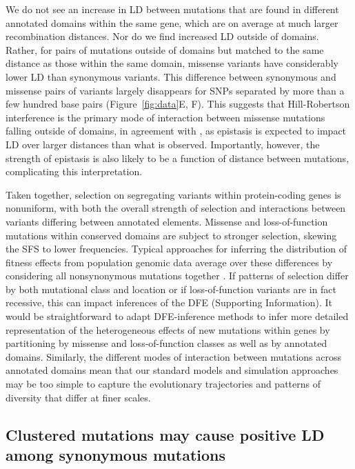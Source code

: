 \documentclass[]{article}
\begin{document}
We do not see an increase in LD between mutations that are found in different
annotated domains within the same gene, which are on average at much larger
recombination distances. Nor do we find increased LD outside of domains.
Rather, for pairs of mutations outside of domains but matched to the same
distance as those within the same domain, missense variants have considerably
lower LD than synonymous variants. This difference between synonymous and
missense pairs of variants largely disappears for SNPs separated by more than a
few hundred base pairs (Figure~\ref{fig:data}E, F). This suggests that
Hill-Robertson interference is the primary mode of interaction between missense
mutations falling outside of domains, in agreement with \citet{Garcia2021-zn},
as epistasis is expected to impact LD over larger distances than what is
observed. Importantly, however, the strength of epistasis is also likely to be
a function of distance between mutations, complicating this interpretation.

Taken together, selection on segregating variants within protein-coding genes
is nonuniform, with both the overall strength of selection and interactions
between variants differing between annotated elements. Missense and
loss-of-function mutations within conserved domains are subject to stronger
selection, skewing the SFS to lower frequencies. Typical approaches for
inferring the distribution of fitness effects from population genomic data
average over these differences by considering all nonsynonymous mutations
together \citep{Boyko2008-zk,Kim2017-xo}. If patterns of selection differ by
both mutational class and location or if loss-of-function variants are in fact
recessive, this can impact inferences of the DFE (Supporting Information). It
would be straightforward to adapt DFE-inference methods to infer more detailed
representation of the heterogeneous effects of new mutations within genes by
partitioning by missense and loss-of-function classes as well as by annotated
domains. Similarly, the different modes of interaction between mutations across
annotated domains mean that our standard models and simulation approaches may
be too simple to capture the evolutionary trajectories and patterns of
diversity that differ at finer scales.

\subsection{Clustered mutations may cause positive LD among synonymous mutations}
\end{document}

